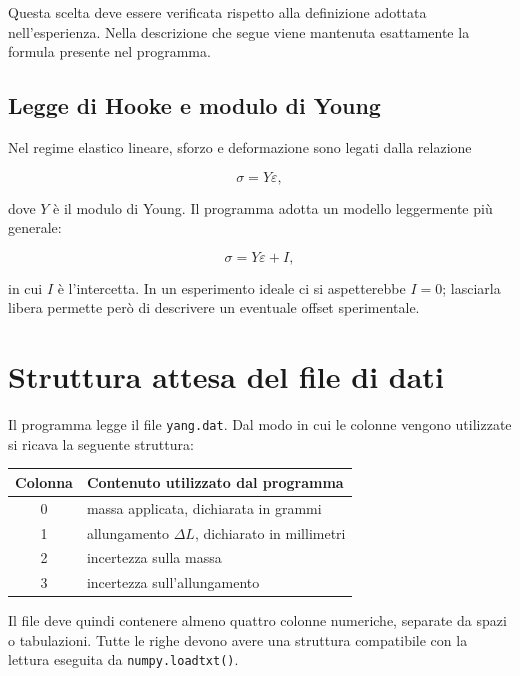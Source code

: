 \documentclass[11pt,a4paper]{book}
\begin{document}
Questa scelta deve essere verificata rispetto alla definizione adottata nell'esperienza. Nella descrizione che segue viene mantenuta esattamente la formula presente nel programma.

\subsection{Legge di Hooke e modulo di Young}

Nel regime elastico lineare, sforzo e deformazione sono legati dalla relazione

\begin{equation}
    \sigma=Y\varepsilon,
\end{equation}

dove $Y$ è il modulo di Young. Il programma adotta un modello leggermente più generale:

\begin{equation}
    \sigma=Y\varepsilon+I,
\end{equation}

in cui $I$ è l'intercetta. In un esperimento ideale ci si aspetterebbe $I=0$; lasciarla libera permette però di descrivere un eventuale offset sperimentale.

\section{Struttura attesa del file di dati}

Il programma legge il file \texttt{yang.dat}. Dal modo in cui le colonne vengono utilizzate si ricava la seguente struttura:

\begin{center}
\begin{tabular}{cl}
\toprule
Colonna & Contenuto utilizzato dal programma \\
\midrule
0 & massa applicata, dichiarata in grammi \\
1 & allungamento $\Delta L$, dichiarato in millimetri \\
2 & incertezza sulla massa \\
3 & incertezza sull'allungamento \\
\bottomrule
\end{tabular}
\end{center}

Il file deve quindi contenere almeno quattro colonne numeriche, separate da spazi o tabulazioni. Tutte le righe devono avere una struttura compatibile con la lettura eseguita da \texttt{numpy.loadtxt()}.
\end{document}
